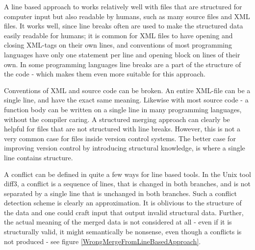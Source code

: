 \documentclass[11pt]{article}
\begin{document}
A line based approach to works relatively well with files that are structured for computer input but also readable by humans, such as many source files and XML files. It works well, since line breaks often are used to make the structured data easily readable for humans; it is common for XML files to have opening and closing XML-tags on their own lines, and conventions of most programming languages have only one statement per line and opening block on lines of their own. In some programming languages line breaks are a part of the structure of the code - which makes them even more suitable for this approach.

Conventions of XML and source code can be broken. An entire XML-file can be a single line, and have the exact same meaning. Likewise with most source code - a function body can be written on a single line in many programming languages, without the compiler caring. A structured merging approach can clearly be helpful for files that are not structured with line breaks. However, this is not a very common case for files inside version control systems. The better case for improving version control by introducing structural knowledge, is where a single line contains structure.


A conflict can be defined in quite a few ways for line based tools. In the Unix tool diff3, a conflict is a sequence of lines, that is changed in both branches, and is not separated by a single line that is unchanged in both branches. Such a conflict detection scheme is clearly an approximation. It is oblivious to the structure of the data and one could craft input that output invalid structural data. Further, the  actual meaning of the merged data is not considered at all - even if it is structurally valid, it might semantically be nonsense, even though a conflicts is not produced - see figure \ref{WrongMergeFromLineBasedApproach}.
\end{document}
